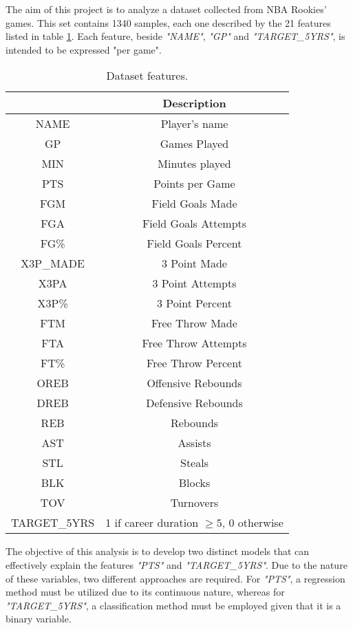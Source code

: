 The aim of this project is to analyze a dataset collected from NBA Rookies' games. This set contains 1340 samples, each one described by the 21 features listed in table \ref{tab:1}. Each feature, beside \textit{"NAME"}, \textit{"GP"} and \textit{"TARGET\_5YRS"}, is intended to be expressed "per game".
\begin{table}[h]
	\centering
	\small
	\begin{tabular}{||c | c ||}
		\hline
		& Description\\
		\hline
		NAME & Player's name\\ 
		GP & Games Played\\ 
		MIN & Minutes played\\ 
		PTS & Points per Game\\
		FGM & Field Goals Made\\
		FGA & Field Goals Attempts\\
		FG\% & Field Goals Percent\\
		X3P\_MADE & 3 Point Made\\
		X3PA & 3 Point Attempts\\
		X3P\% & 3 Point Percent\\
		FTM & Free Throw Made\\
		FTA & Free Throw Attempts\\
		FT\% & Free Throw Percent\\
		OREB & Offensive Rebounds\\
		DREB & Defensive Rebounds\\
		REB & Rebounds\\
		AST & Assists\\
		STL & Steals\\
		BLK & Blocks\\
		TOV & Turnovers\\
		TARGET\_5YRS & 1 if career duration $\geq 5$, 0 otherwise\\
		\hline
	\end{tabular}
	\caption{Dataset features.}
	\label{tab:1}
\end{table} 

The objective of this analysis is to develop two distinct models that can effectively explain the features \textit{"PTS"} and \textit{"TARGET\_5YRS"}. Due to the nature of these variables, two different approaches are required. For \textit{"PTS"}, a regression method must be utilized due to its continuous nature, whereas for \textit{"TARGET\_5YRS"}, a classification method must be employed given that it is a binary variable.